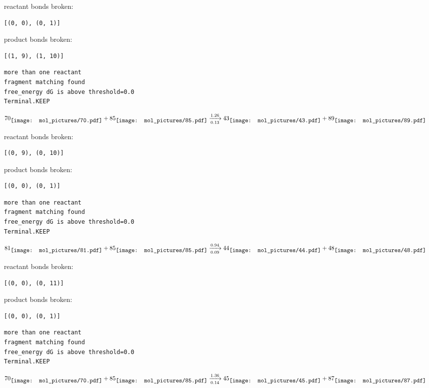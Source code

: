 \documentclass{article}
\begin{document}
reactant bonds broken:\begin{verbatim}
[(0, 0), (0, 1)]
\end{verbatim}
product bonds broken:\begin{verbatim}
[(1, 9), (1, 10)]
\end{verbatim}




\vspace{1cm}
\begin{verbatim}
more than one reactant
fragment matching found
free_energy dG is above threshold=0.0
Terminal.KEEP
\end{verbatim}
$$
70
\raisebox{-.5\height}{\texttt{[image: mol\_pictures/70.pdf]}}
+
85
\raisebox{-.5\height}{\texttt{[image: mol\_pictures/85.pdf]}}
\xrightarrow[0.13]{1.26}
43
\raisebox{-.5\height}{\texttt{[image: mol\_pictures/43.pdf]}}
+
89
\raisebox{-.5\height}{\texttt{[image: mol\_pictures/89.pdf]}}
$$


reactant bonds broken:\begin{verbatim}
[(0, 9), (0, 10)]
\end{verbatim}
product bonds broken:\begin{verbatim}
[(0, 0), (0, 1)]
\end{verbatim}




\vspace{1cm}
\begin{verbatim}
more than one reactant
fragment matching found
free_energy dG is above threshold=0.0
Terminal.KEEP
\end{verbatim}
$$
81
\raisebox{-.5\height}{\texttt{[image: mol\_pictures/81.pdf]}}
+
85
\raisebox{-.5\height}{\texttt{[image: mol\_pictures/85.pdf]}}
\xrightarrow[0.09]{0.94}
44
\raisebox{-.5\height}{\texttt{[image: mol\_pictures/44.pdf]}}
+
48
\raisebox{-.5\height}{\texttt{[image: mol\_pictures/48.pdf]}}
$$


reactant bonds broken:\begin{verbatim}
[(0, 0), (0, 11)]
\end{verbatim}
product bonds broken:\begin{verbatim}
[(0, 0), (0, 1)]
\end{verbatim}




\vspace{1cm}
\begin{verbatim}
more than one reactant
fragment matching found
free_energy dG is above threshold=0.0
Terminal.KEEP
\end{verbatim}
$$
70
\raisebox{-.5\height}{\texttt{[image: mol\_pictures/70.pdf]}}
+
85
\raisebox{-.5\height}{\texttt{[image: mol\_pictures/85.pdf]}}
\xrightarrow[0.14]{1.36}
45
\raisebox{-.5\height}{\texttt{[image: mol\_pictures/45.pdf]}}
+
87
\raisebox{-.5\height}{\texttt{[image: mol\_pictures/87.pdf]}}
$$
\end{document}
